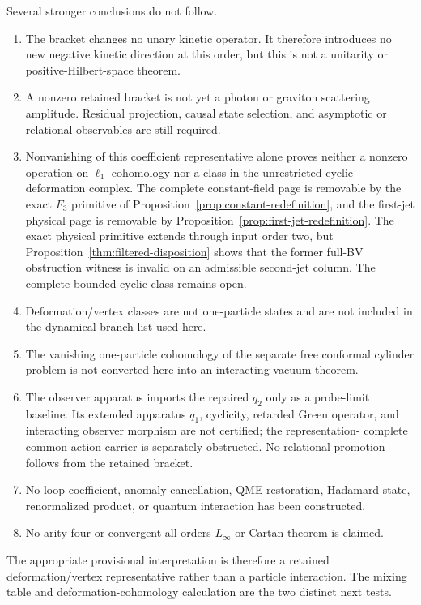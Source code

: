 \documentclass[11pt]{article}
\theoremstyle{definition}
\theoremstyle{remark}
\begin{document}
Several stronger conclusions do not follow.
\begin{enumerate}
\item The bracket changes no unary kinetic operator.  It therefore introduces
no new negative kinetic direction at this order, but this is not a unitarity
or positive-Hilbert-space theorem.
\item A nonzero retained bracket is not yet a photon or graviton scattering
amplitude.  Residual projection, causal state selection, and asymptotic or
relational observables are still required.
\item Nonvanishing of this coefficient representative alone proves neither a
nonzero operation on $\ell_1$-cohomology nor a class in the unrestricted
cyclic deformation complex.  The complete constant-field page is removable by the exact
$F_3$ primitive of Proposition~\ref{prop:constant-redefinition}, and the
first-jet physical page is removable by
Proposition~\ref{prop:first-jet-redefinition}.  The exact physical primitive
extends through input order two, but
Proposition~\ref{thm:filtered-disposition} shows that the former full-BV
obstruction witness is invalid on an admissible second-jet column.  The
complete bounded cyclic class remains open.
\item Deformation/vertex classes are not one-particle states and are not
included in the dynamical branch list used here.
\item The vanishing one-particle cohomology of the separate free conformal
cylinder problem is not converted here into an interacting vacuum theorem.
\item The observer apparatus imports the repaired $q_2$ only as a probe-limit
baseline.  Its extended apparatus $q_1$, cyclicity, retarded Green operator,
and interacting observer morphism are not certified; the representation-
complete common-action carrier is separately obstructed.  No relational
promotion follows from the retained bracket.
\item No loop coefficient, anomaly cancellation, QME restoration, Hadamard
state, renormalized product, or quantum interaction has been constructed.
\item No arity-four or convergent all-orders $L_\infty$ or Cartan theorem is
claimed.
\end{enumerate}

The appropriate provisional interpretation is therefore a retained
deformation/vertex representative rather than a particle interaction.  The
mixing table and deformation-cohomology calculation are the two distinct next
tests.
\end{document}
